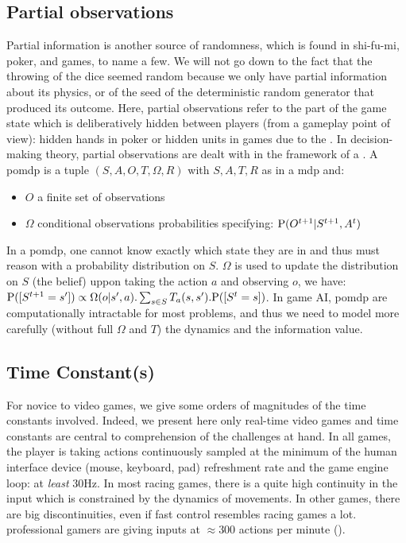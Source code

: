 \subsection{Partial observations}
Partial information is another source of randomness, which is found in shi-fu-mi, poker,  and  games, to name a few. We will not go down to the fact that the throwing of the dice seemed random because we only have partial information about its physics, or of the seed of the deterministic random generator that produced its outcome. Here, partial observations refer to the part of the game state which is deliberatively hidden between players (from a gameplay point of view): hidden hands in poker or hidden units in  games due to the . In decision-making theory, partial observations are dealt with in the framework of a  \citep{Sondik}. A \gls{pomdp} is a tuple $(S,A,O,T,\Omega,R)$ with $S,A,T,R$ as in a \gls{mdp} and:
\begin{itemize}
    \item $O$ a finite set of observations
    \item $\Omega$ conditional observations probabilities specifying: $\mathrm{P}(O^{t+1}|S^{t+1},A^t)$
\end{itemize}
In a \gls{pomdp}, one cannot know exactly which state they are in and thus must reason with a probability distribution on $S$. $\Omega$ is used to update the distribution on $S$ (the belief) uppon taking the action $a$ and observing $o$, we have: $\mathrm{P}([S^{t+1}=s']) \propto \Omega(o|s',a).\sum_{s \in S} T_a(s,s').\mathrm{P}([S^t=s])$. In game AI, \gls{pomdp} are computationally intractable for most problems, and thus we need to model more carefully (without full $\Omega$ and $T$) the dynamics and the information value.

\subsection{Time Constant(s)}

For novice to video games, we give some orders of magnitudes of the time constants involved. Indeed, we present here only real-time video games and time constants are central to comprehension of the challenges at hand. In all games, the player is taking actions continuously sampled at the minimum of the human interface device (mouse, keyboard, pad) refreshment rate and the game engine loop: at \textit{least} 30Hz. In most racing games, there is a quite high continuity in the input which is constrained by the dynamics of movements. In other games, there are big discontinuities, even if fast  control resembles racing games a lot.  professional gamers are giving inputs at $\approx 300$ actions per minute ().


